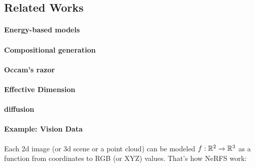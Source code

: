 \documentclass{article}
\begin{document}
\subsection{Related Works}



\paragraph{Energy-based models} \cite{song2021trainenergybasedmodels, du2019implicit, lecun2006tutorial, zhu2024learning, du2021unsupervised, du2020compositional}


\paragraph{Compositional generation} \cite{decompdiffusion, liu2021learning, 10.1007/978-3-031-19790-1_26, DBLP:conf/iccv/0010DLT023, composition_position,  bagautdinov2018modeling}

\paragraph{Occam's razor} \cite{elmoznino2025incontextlearningoccamsrazor, rasmussen2000occam}

\paragraph{Effective Dimension} \cite{6678226}

\paragraph{diffusion} \cite{li2025scores}

\paragraph{Example: Vision Data}

Each 2d image (or 3d scene or a point cloud) can be modeled $f: \mathbb{R}^2 \to \mathbb{R}^3$ as a function from coordinates to RGB (or XYZ) values. That's how NeRFS work:
\end{document}

